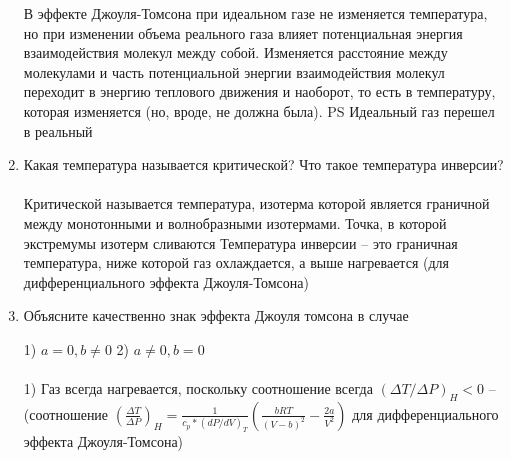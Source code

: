 \documentclass[a4paper,12pt]{article} %
\begin{document}
\begin{enumerate}
В эффекте Джоуля-Томсона при идеальном газе  не изменяется температура, но при изменении объема реального газа влияет потенциальная энергия взаимодействия молекул между собой. Изменяется расстояние между молекулами и часть потенциальной энергии взаимодействия молекул переходит в энергию теплового движения и наоборот, то есть в температуру, которая изменяется (но, вроде, не должна была). 
PS Идеальный газ перешел в реальный

\item Какая температура называется критической? Что такое температура инверсии?\\ \\
Критической называется температура, изотерма которой является граничной между монотонными и волнобразными изотермами. Точка, в которой экстремумы изотерм сливаются
Температура инверсии -- это граничная температура, ниже которой газ охлаждается, а выше нагревается (для дифференциального эффекта Джоуля-Томсона)
\item Объясните качественно знак эффекта Джоуля томсона в случае
 
 1) $a = 0,b \not= 0$
 2) $a \not= 0,b = 0$\\ \\
 1) Газ всегда нагревается, поскольку соотношение всегда $(\Delta T/\Delta P)_H<0$ -- (соотношение $(\frac{\Delta T}{\Delta P})_H=\frac{1}{c_p * (dP/dV)_T}(\frac{bRT}{(V-b)^2}-\frac{2a}{V^2})$ для дифференциального эффекта Джоуля-Томсона)
\end{enumerate}
\end{document}
